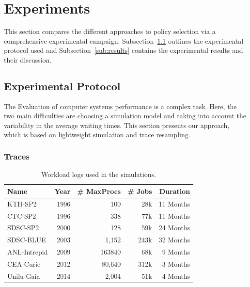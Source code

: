 \documentclass[sigconf,review,anonymous]{acmart}
\newcommand{\ra}[1]{\renewcommand{\arraystretch}{#1}}
\begin{document}
\section{Experiments}
\label{sec:experiments}

This section compares the different approaches to policy selection via a
comprehensive experimental campaign.  Subsection~\ref{sub:protocol} outlines
the experimental protocol used and Subsection~\ref{sub:results} contains the
experimental results and their discussion.

\subsection{Experimental Protocol}
\label{sub:protocol}

The Evaluation of computer systems performance is a complex
task. Here, the two main difficulties are choosing a simulation
model and taking into account the variability in the average waiting times.
This section presents our approach, which is based on lightweight simulation
and trace resampling.

\subsubsection{Traces}
\label{sub:traces}

\begin{table}[]
  \centering
  \ra{1.3}
  \caption{Workload logs used in the simulations.}
  \label{tab:logs}
  \begin{tabular}{@{}lrrrr@{}}
    \hline
    Name          & Year & \# MaxProcs & \# Jobs & Duration\\
    \hline
    KTH-SP2       & 1996 & 100         & 28k     & 11 Months\\
    CTC-SP2       & 1996 & 338         & 77k     & 11 Months\\
    SDSC-SP2      & 2000 & 128         & 59k     & 24 Months\\
    SDSC-BLUE     & 2003 & 1,152       & 243k    & 32 Months\\
    ANL-Intrepid  & 2009 & 163840      & 68k     & 9  Months\\
    CEA-Curie     & 2012 & 80,640      & 312k    & 3  Months\\
    Unilu-Gaia    & 2014 & 2,004       & 51k     & 4  Months\\
    \hline
  \end{tabular}
\end{table}
\end{document}
